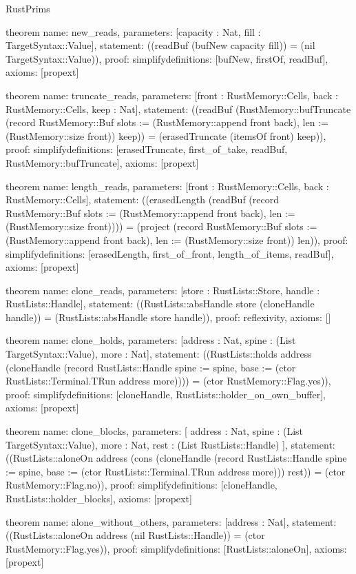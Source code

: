 \begin{lexlean}{RustPrims}
\begin{semanticmodule}
theorem{
  name: new_reads,
  parameters: [capacity : Nat, fill : TargetSyntax::Value],
  statement: ((readBuf (bufNew capacity fill)) = (nil TargetSyntax::Value)),
  proof: simplify{definitions: [bufNew, firstOf, readBuf]},
  axioms: [propext]
}

theorem{
  name: truncate_reads,
  parameters: [front : RustMemory::Cells, back : RustMemory::Cells, keep : Nat],
  statement: ((readBuf (RustMemory::bufTruncate (record RustMemory::Buf {slots := (RustMemory::append front back), len := (RustMemory::size front)}) keep)) = (erasedTruncate (itemsOf front) keep)),
  proof: simplify{definitions: [erasedTruncate, first_of_take, readBuf, RustMemory::bufTruncate]},
  axioms: [propext]
}

theorem{
  name: length_reads,
  parameters: [front : RustMemory::Cells, back : RustMemory::Cells],
  statement: ((erasedLength (readBuf (record RustMemory::Buf {slots := (RustMemory::append front back), len := (RustMemory::size front)}))) = (project (record RustMemory::Buf {slots := (RustMemory::append front back), len := (RustMemory::size front)}) len)),
  proof: simplify{definitions: [erasedLength, first_of_front, length_of_items, readBuf]},
  axioms: [propext]
}

theorem{
  name: clone_reads,
  parameters: [store : RustLists::Store, handle : RustLists::Handle],
  statement: ((RustLists::absHandle store (cloneHandle handle)) = (RustLists::absHandle store handle)),
  proof: reflexivity{},
  axioms: []
}

theorem{
  name: clone_holds,
  parameters: [address : Nat, spine : (List TargetSyntax::Value), more : Nat],
  statement: ((RustLists::holds address (cloneHandle (record RustLists::Handle {spine := spine, base := (ctor RustLists::Terminal.TRun address more)}))) = (ctor RustMemory::Flag.yes)),
  proof: simplify{definitions: [cloneHandle, RustLists::holder_on_own_buffer]},
  axioms: [propext]
}

theorem{
  name: clone_blocks,
  parameters: [
    address : Nat,
    spine : (List TargetSyntax::Value),
    more : Nat,
    rest : (List RustLists::Handle)
  ],
  statement: ((RustLists::aloneOn address (cons (cloneHandle (record RustLists::Handle {spine := spine, base := (ctor RustLists::Terminal.TRun address more)})) rest)) = (ctor RustMemory::Flag.no)),
  proof: simplify{definitions: [cloneHandle, RustLists::holder_blocks]},
  axioms: [propext]
}

theorem{
  name: alone_without_others,
  parameters: [address : Nat],
  statement: ((RustLists::aloneOn address (nil RustLists::Handle)) = (ctor RustMemory::Flag.yes)),
  proof: simplify{definitions: [RustLists::aloneOn]},
  axioms: [propext]
}


\end{semanticmodule}
\end{lexlean}
